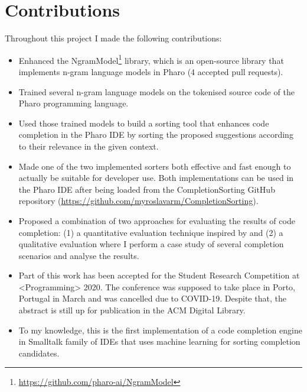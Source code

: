 \section{Contributions}
\label{sec:Introduction-Contributions}
Throughout this project I made the following contributions:
\begin{itemize}
    \item Enhanced the NgramModel\footnote{\url{https://github.com/pharo-ai/NgramModel}} library, which is an open-source library that implements n-gram language models in Pharo (4 accepted pull requests).
    \item Trained several n-gram language models on the tokenised source code of the Pharo programming language.
    \item Used those trained models to build a sorting tool that enhances code completion in the Pharo IDE by sorting the proposed suggestions according to their relevance in the given context.
    \item Made one of the two implemented sorters both effective and fast enough to actually be suitable for developer use. Both implementations can be used in the Pharo IDE after being loaded from the CompletionSorting GitHub repository (\url{https://github.com/myroslavarm/CompletionSorting}).
    \item Proposed a combination of two approaches for evaluating the results of code completion: (1) a quantitative evaluation technique inspired by \cite{Robb08a} and (2) a qualitative evaluation where I perform a case study of several completion scenarios and analyse the results.
    \item Part of this work has been accepted for the Student Research Competition at <Programming> 2020. The conference was supposed to take place in Porto, Portugal in March and was cancelled due to COVID-19. Despite that, the abstract is still up for publication in the ACM Digital Library.
    \item To my knowledge, this is the first implementation of a code completion engine in Smalltalk family of IDEs that uses machine learning for sorting completion candidates.
\end{itemize}

